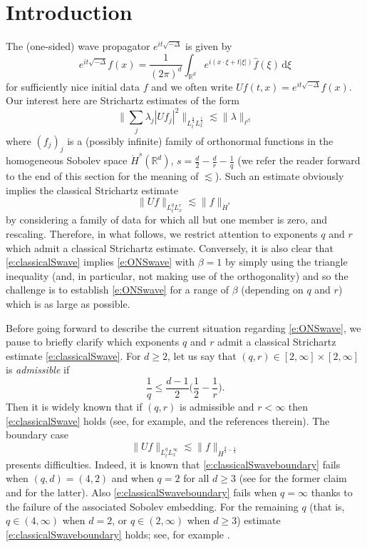 \documentclass[a4paper]{amsart}
\numberwithin{equation}{section}%
\theoremstyle{plain}%
\theoremstyle{definition}
\theoremstyle{remark}%
\begin{document}
\section{Introduction}
The (one-sided) wave propagator $e^{it\sqrt{-\Delta}}$ is given by
\[
e^{it\sqrt{-\Delta}}f(x) = \frac{1}{(2\pi)^d} \int_{\mathbb{R}^d} e^{i(x \cdot \xi + t|\xi|)} \widehat{f}(\xi) \, \mathrm{d}\xi
\]
for sufficiently nice initial data $f$ and we often write $Uf(t,x) = e^{it\sqrt{-\Delta}}f(x)$. Our interest here are Strichartz estimates of the form
\begin{equation} \label{e:ONSwave}
\bigg\| \sum_j \lambda_j |Uf_j|^2 \bigg\|_{L^{\frac{q}{2}}_tL^\frac{r}{2}_x} \lesssim \| \lambda \|_{\ell^\beta}
\end{equation}
where $(f_j)_j$ is a (possibly infinite) family of orthonormal functions in the homogeneous Sobolev space $\dot{H}^{s}(\mathbb{R}^d)$, $s = \frac{d}{2} - \frac{d}{r} - \frac{1}{q}$ (we refer the reader forward to the end of this section for the meaning of $\lesssim$). Such an estimate obviously implies the classical Strichartz estimate
\begin{equation} \label{e:classicalSwave}
\| Uf \|_{L^q_tL^r_x} \lesssim \|f\|_{\dot{H}^s}
\end{equation}
by considering a family of data for which all but one member is zero, and rescaling. Therefore, in what follows, we restrict attention to exponents $q$ and $r$ which admit a classical Strichartz estimate. Conversely, it is also clear that \eqref{e:classicalSwave} implies \eqref{e:ONSwave} with $\beta = 1$ by simply using the triangle inequality (and, in particular, not making use of the orthogonality) and so the challenge is to establish \eqref{e:ONSwave} for a range of $\beta$ (depending on $q$ and $r$) which is as large as possible. 

Before going forward to describe the current situation regarding \eqref{e:ONSwave}, we pause to briefly clarify which exponents $q$ and $r$ admit a classical Strichartz estimate \eqref{e:classicalSwave}. For $d \geq 2$, let us say that $(q,r) \in [2,\infty] \times [2,\infty]$ is \emph{admissible} if 
\begin{equation*} 
\frac{1}{q} \leq \frac{d-1}{2}\bigg(\frac{1}{2} - \frac{1}{r}\bigg).
\end{equation*}
Then it is widely known that if $(q,r)$ is admissible and $r < \infty$ then \eqref{e:classicalSwave} holds (see, for example, \cite{KeelTao} and the references therein). The boundary case  
\begin{equation} \label{e:classicalSwaveboundary}
\| Uf \|_{L^q_tL^\infty_x} \lesssim \|f\|_{\dot{H}^{\frac{d}{2} - \frac{1}{q}}}
\end{equation}
presents difficulties. Indeed, it is known that \eqref{e:classicalSwaveboundary} fails when $(q,d) = (4,2)$ and when $q = 2$ for all $d \geq 3$ (see \cite[Theorem 3]{FangWang} for the former claim and \cite[Theorem 1.1]{GLNY} for the latter). Also \eqref{e:classicalSwaveboundary} fails when $q = \infty$ thanks to the failure of the associated Sobolev embedding. For the remaining  $q$ (that is, $q \in (4,\infty)$ when $d = 2$, or $q \in (2,\infty)$ when $d \geq 3$) estimate \eqref{e:classicalSwaveboundary} holds; see, for example \cite[Theorem 3]{FangWang}.
\end{document}
